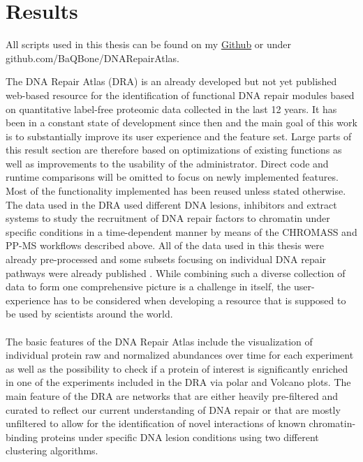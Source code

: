 \section{Results}\label{sec:results}
\begin{center}
    All scripts used in this thesis can be found on my \hyperlink{https://github.com/BaQBone/DNARepairAtlas}{Github} or under github.com/BaQBone/DNARepairAtlas. 
\end{center}
The DNA Repair Atlas (DRA) is an already developed but not yet published web-based resource for the identification of functional DNA repair modules based on quantitative label-free proteomic data collected in the last 12 years. It has been in a constant state of development since then \citep{Menges.2018} and the main goal of this work is to substantially improve its user experience and the feature set. Large parts of this result section are therefore based on optimizations of existing functions  as well as improvements to the usability of the administrator. Direct code and runtime comparisons will be omitted to focus on newly implemented features. Most of the functionality implemented has been reused unless stated otherwise. The data used in the DRA used different DNA lesions, inhibitors and extract systems to study the recruitment of DNA repair factors to chromatin under specific conditions in a time-dependent manner by means of the CHROMASS and PP-MS workflows described above. All of the data used in this thesis were already pre-processed and some subsets focusing on individual DNA repair pathways were already published \citep{Raschle.2015,Haahr.2016}. While combining such a diverse collection of data to form one comprehensive picture is a challenge in itself, the user-experience has to be considered when developing a resource that is supposed to be used by scientists around the world.\\\\
The basic features of the DNA Repair Atlas include the visualization of individual protein raw and normalized abundances over time for each experiment as well as the possibility to check if a protein of interest is significantly enriched in one of the experiments included in the DRA via polar and Volcano plots. The main feature of the DRA are networks that are either heavily pre-filtered and curated to reflect our current understanding of DNA repair or that are mostly unfiltered to allow for the identification of novel interactions of known chromatin-binding proteins under specific DNA lesion conditions using two different clustering algorithms. 

